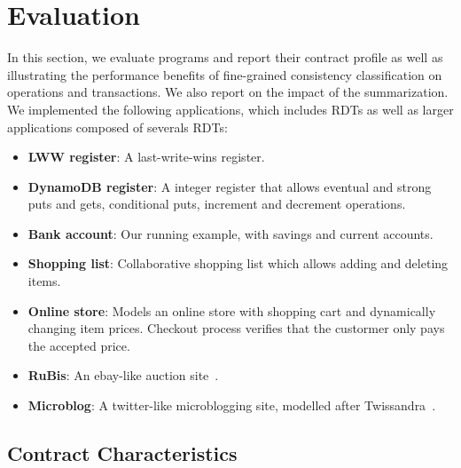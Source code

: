 \section{Evaluation}

In this section, we evaluate \name programs and report their contract profile
as well as illustrating the performance benefits of fine-grained consistency
classification on operations and transactions. We also report on the impact of
the summarization. We implemented the following applications, which includes
RDTs as well as larger applications composed of severals RDTs:

\begin{itemize}

\item \textbf{LWW register}: A last-write-wins register.

\item \textbf{DynamoDB register}: A integer register that allows eventual and
strong puts and gets, conditional puts, increment and decrement operations.

\item \textbf{Bank account}: Our running example, with savings and current
accounts.

\item \textbf{Shopping list}: Collaborative shopping list which allows adding
and deleting items.

\item \textbf{Online store}: Models an online store with shopping cart and
dynamically changing item prices. Checkout process verifies that the custormer
only pays the accepted price. \item \textbf{RuBis}: An ebay-like auction
site~\cite{}.

\item \textbf{Microblog}: A twitter-like microblogging site, modelled after
Twissandra~\cite{}.

\end{itemize}

\subsection{Contract Characteristics}

